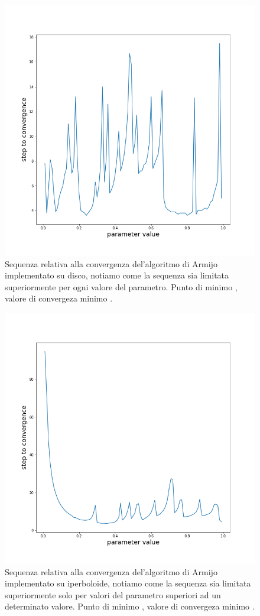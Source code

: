 \documentclass[a4paper, 12pt]{article}
\begin{document}
\begin{figure}[t] %
    \centering\includegraphics[width=1\textwidth]{armijo_parameter_poincare.png}
    \caption{Sequenza relativa alla convergenza del'algoritmo di Armijo implementato su disco, notiamo come la sequenza sia limitata superiormente per ogni valore del parametro. Punto di minimo , valore di convergeza minimo .}
\end{figure}
\begin{figure}[t] %
    \centering\includegraphics[width=1\textwidth]{armijo_parameter_hyperboloid.png}
    \caption{Sequenza relativa alla convergenza del'algoritmo di Armijo implementato su iperboloide, notiamo come la sequenza sia limitata superiormente solo per valori del parametro superiori ad un determinato valore. Punto di minimo , valore di convergeza minimo .}
\end{figure}
\end{document}
